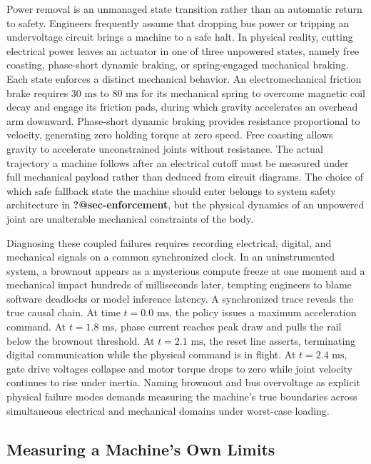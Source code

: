 \documentclass[
  letterpaper,
  DIV=11,
  numbers=noendperiod]{scrartcl}
\begin{document}
Power removal is an unmanaged state transition rather than an automatic
return to safety. Engineers frequently assume that dropping bus power or
tripping an undervoltage circuit brings a machine to a safe halt. In
physical reality, cutting electrical power leaves an actuator in one of
three unpowered states, namely free coasting, phase-short dynamic
braking, or spring-engaged mechanical braking. Each state enforces a
distinct mechanical behavior. An electromechanical friction brake
requires \(30\text{ ms}\) to \(80\text{ ms}\) for its mechanical spring
to overcome magnetic coil decay and engage its friction pads, during
which gravity accelerates an overhead arm downward. Phase-short dynamic
braking provides resistance proportional to velocity, generating zero
holding torque at zero speed. Free coasting allows gravity to accelerate
unconstrained joints without resistance. The actual trajectory a machine
follows after an electrical cutoff must be measured under full
mechanical payload rather than deduced from circuit diagrams. The choice
of which safe fallback state the machine should enter belongs to system
safety architecture in \textbf{?@sec-enforcement}, but the physical
dynamics of an unpowered joint are unalterable mechanical constraints of
the body.

Diagnosing these coupled failures requires recording electrical,
digital, and mechanical signals on a common synchronized clock. In an
uninstrumented system, a brownout appears as a mysterious compute freeze
at one moment and a mechanical impact hundreds of milliseconds later,
tempting engineers to blame software deadlocks or model inference
latency. A synchronized trace reveals the true causal chain. At time
\(t = 0.0\text{ ms}\), the policy issues a maximum acceleration command.
At \(t = 1.8\text{ ms}\), phase current reaches peak draw and pulls the
rail below the brownout threshold. At \(t = 2.1\text{ ms}\), the reset
line asserts, terminating digital communication while the physical
command is in flight. At \(t = 2.4\text{ ms}\), gate drive voltages
collapse and motor torque drops to zero while joint velocity continues
to rise under inertia. Naming brownout and bus overvoltage as explicit
physical failure modes demands measuring the machine's true boundaries
across simultaneous electrical and mechanical domains under worst-case
loading.

\subsection{Measuring a Machine's Own Limits}\label{sec-body-2-7}
\end{document}
